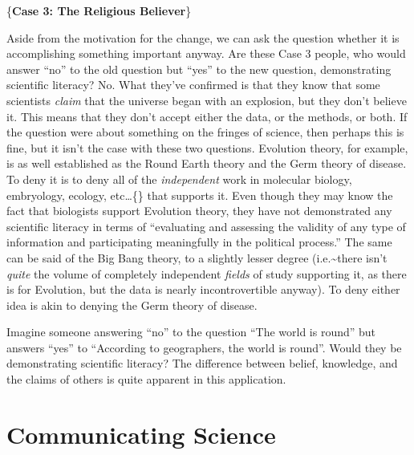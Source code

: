 \documentclass{tufte-book}
\begin{document}
\{\textbf{Case 3: The Religious Believer}\}

Aside from the motivation for the change, we can ask the question
whether it is accomplishing something important anyway. Are these Case 3
people, who would answer ``no'' to the old question but ``yes'' to the
new question, demonstrating scientific literacy? No. What they've
confirmed is that they know that some scientists \emph{claim} that the
universe began with an explosion, but they don't believe it. This means
that they don't accept either the data, or the methods, or both. If the
question were about something on the fringes of science, then perhaps
this is fine, but it isn't the case with these two questions. Evolution
theory, for example, is as well established as the Round Earth theory
and the Germ theory of disease. To deny it is to deny all of the
\emph{independent} work in molecular biology, embryology, ecology,
etc\ldots\{\} that supports it. Even though they may know the fact that
biologists support Evolution theory, they have not demonstrated any
scientific literacy in terms of ``evaluating and assessing the validity
of any type of information and participating meaningfully in the
political process.'' The same can be said of the Big Bang theory, to a
slightly lesser degree (i.e.\textasciitilde{}there isn't \emph{quite}
the volume of completely independent \emph{fields} of study supporting
it, as there is for Evolution, but the data is nearly incontrovertible
anyway). To deny either idea is akin to denying the Germ theory of
disease.

Imagine someone answering ``no'' to the question ``The world is round''
but answers ``yes'' to ``According to geographers, the world is round''.
Would they be demonstrating scientific literacy? The difference between
belief, knowledge, and the claims of others is quite apparent in this
application.

\section{Communicating Science}\label{communicating-science}
\end{document}
